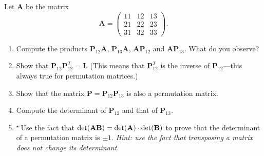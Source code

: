 \documentclass[11pt,a4paper]{article}
\def\bA{\mathbf{A}}
\def\bB{\mathbf{B}}
\def\bI{\mathbf{I}}
\def\bP{\mathbf{P}}
\def\tough{$\!\!\!{}^\star\>$}
\begin{document}
\begin{enumerate}
Let $\bA$ be the matrix
$$  \bA =  \left ( \begin{array}{ccc}  11 & 12 & 13\\  21 & 22 & 23 \\  31 & 32 & 33 \end{array} \right ).$$
\begin{enumerate}
\item Compute the products $\bP_{12} \bA$,  $\bP_{13} \bA$,   $\bA\bP_{12}$ and  $\bA\bP_{13}$.
What do you observe?
\item  Show that  $\bP_{12} \bP_{12}^T = \bI$.  (This means that $\bP_{12}^T$ is the inverse of   $\bP_{12}$---this
always true for permutation matrices.)
\item Show that the matrix $\bP= \bP_{12} \bP_{13} $ is also a permutation matrix. 
\item Compute  the determinant of $\bP_{12}$ and that of $\bP_{13}$.
\item\tough Use the fact that  $\hbox{det}(\bA \bB) =  \hbox{det}(\bA) \cdot \hbox{det}(\bB)$ to
prove that the determinant of a permutation matrix is $\pm 1$. \emph{Hint: 
use the fact that transposing a matrix does not change its determinant.}


\end{enumerate}
\end{enumerate}
\end{document}
